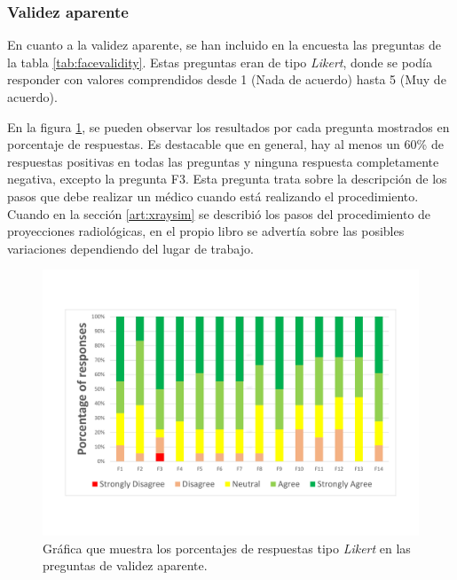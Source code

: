 \subsubsection{Validez aparente}

En cuanto a la validez aparente, se han incluido en la encuesta las preguntas de la tabla \ref{tab:facevalidity}. Estas preguntas eran de tipo \emph{Likert}, donde se podía responder con valores comprendidos desde 1 (Nada de acuerdo) hasta 5 (Muy de acuerdo). 

En la figura \ref{fig:facevalidity}, se pueden observar los resultados por cada pregunta mostrados en porcentaje de respuestas. Es destacable que en general, hay al menos un 60\% de respuestas positivas en todas las preguntas y ninguna respuesta completamente negativa, excepto la pregunta F3. Esta pregunta trata sobre la descripción de los pasos que debe realizar un médico cuando está realizando el procedimiento. Cuando en la sección \ref{art:xraysim} se describió los pasos del procedimiento de proyecciones radiológicas, en el propio libro \cite{manualpractico} se advertía sobre las posibles variaciones dependiendo del lugar de trabajo.  

\begin{figure}[hb]
    \centering
    \includegraphics[trim={15mm 25mm 15mm 25mm},clip,width=\linewidth]{IMG/facevalidty.pdf}
    \caption{Gráfica que muestra los porcentajes de respuestas tipo \emph{Likert} en las preguntas de validez aparente.}
    \label{fig:facevalidity}
\end{figure}


